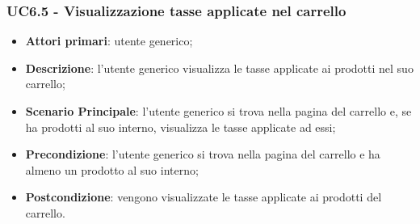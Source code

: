 \subsubsection{UC6.5 - Visualizzazione tasse applicate nel carrello}
\begin{itemize}
\item \textbf{Attori primari}: utente generico;
\item \textbf{Descrizione}: l'utente generico visualizza le tasse applicate ai prodotti nel suo carrello;
\item \textbf{Scenario Principale}: l'utente generico si trova nella pagina del carrello e, se ha prodotti al suo interno, visualizza le tasse applicate ad essi;
\item \textbf{Precondizione}: l'utente generico si trova nella pagina del carrello e ha almeno un prodotto al suo interno;
\item \textbf{Postcondizione}: vengono visualizzate le tasse applicate ai prodotti del carrello.
\end{itemize}




